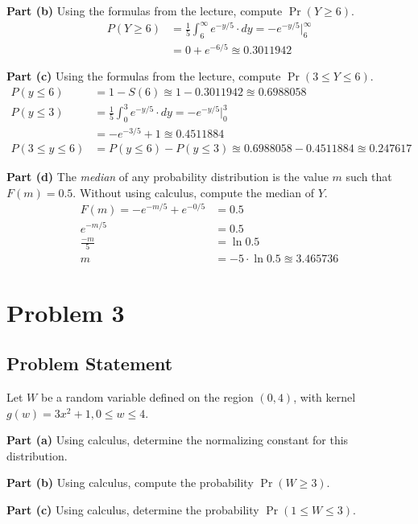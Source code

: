 \documentclass[12pt]{article}
\theoremstyle{definition}
\begin{document}
\bigskip
\noindent
{\bf Part (b)} Using the formulas from the lecture, compute $\Pr( Y \geq 6)$.
\begin{align*}
P(Y \geq 6) &= \frac{1}{5}\int_6^\infty e^{-y/5}\cdot dy = -e^{-y/5}\biggr\rvert_6^{\infty}\\
&= 0 + e^{-6/5} \approxeq 0.3011942
\end{align*}


\bigskip
\noindent
{\bf Part (c)} Using the formulas from the lecture, compute $\Pr( 3 \leq Y \leq 6)$.
\begin{align*}
P(y \leq 6) &= 1 - S(6) \approxeq 1 - 0.3011942 \approxeq 0.6988058\\
P(y \leq 3) &= \frac{1}{5}\int_0^3 e^{-y/5}\cdot dy = -e^{-y/5}\biggr\rvert_0^{3}\\
&= -e^{-3/5} + 1 \approxeq 0.4511884\\
P(3 \leq y \leq 6) &= P(y \leq 6) - P(y \leq 3) \approxeq 0.6988058 - 0.4511884 \approxeq 0.247617
\end{align*}

\bigskip
\noindent
{\bf Part (d)} The {\em median} of any probability distribution is the value $m$ such that $F(m) = 0.5$. Without using calculus, compute the median of $Y$.
\begin{align*}
F(m) = -e^{-m/5} + e^{-0/5} &= 0.5\\
e^{-m/5} &= 0.5\\
\frac{-m}{5} &= \ln{0.5}\\
m &= -5 \cdot \ln{0.5} \approxeq 3.465736
\end{align*}


\newpage
\section*{Problem 3}

\subsection*{Problem Statement}

Let $W$ be a random variable defined on the region $(0,4)$, with kernel $g(w) = 3x^2 + 1, 0 \leq w \leq 4$.

\bigskip
\noindent
{\bf Part (a)} Using calculus, determine the normalizing constant for this distribution.

\bigskip
\noindent
{\bf Part (b)} Using calculus, compute the probability $\Pr(W \geq 3)$.

\bigskip
\noindent
{\bf Part (c)} Using calculus, determine the probability $\Pr(1 \leq W \leq 3)$.
\end{document}
